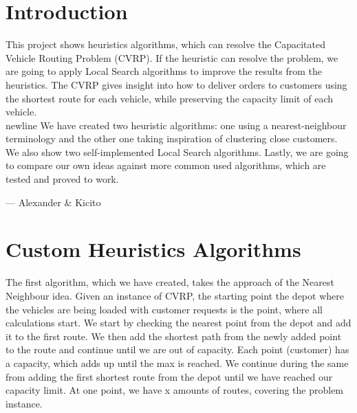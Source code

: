 \documentclass[12pt]{article}
\begin{document}

\tableofcontents
\pagebreak


\section{Introduction}

This project shows heuristics algorithms, which can resolve the Capacitated Vehicle Routing Problem (CVRP). If the heuristic can resolve the problem, we are going to apply Local Search algorithms to improve the results from the heuristics. 
The CVRP gives insight into how to deliver orders to customers using the shortest route for each vehicle, while preserving the capacity limit of each vehicle.\\newline
We have created two heuristic algorithms: one using a nearest-neighbour terminology and the other one taking inspiration of clustering close customers. We also show two self-implemented Local Search algorithms. 
Lastly, we are going to compare our own ideas against more common used algorithms, which are tested and proved to work. 

\hspace{1 cm}--- Alexander \& Kicito

\newpage

\section{Custom Heuristics Algorithms}


The first algorithm, which we have created, takes the approach of the Nearest Neighbour idea. Given an instance of CVRP, the starting point \- the depot where the vehicles are being loaded with customer requests \- is the point, where all calculations start. 
We start by checking the nearest point from the depot and add it to the first route. We then add the shortest path from the newly added point to the route and continue until we are out of capacity. Each point (customer) has a capacity, which adds up until the max is reached. We continue during the same from adding the first shortest route from the depot until we have reached our capacity limit. At one point, we have x amounts of routes, covering the problem instance. 
\newline
\end{document}
